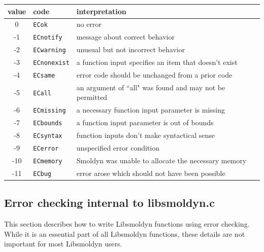 \documentclass {scrbook}
\newcommand {\ttt} {\texttt}
\begin{document}
\begin{longtable}[c]{cll}
value & code & interpretation\\
\hline
0 & \ttt{ECok} & no error\\
-1 & \ttt{ECnotify} & message about correct behavior\\
-2 & \ttt{ECwarning} & unusual but not incorrect behavior\\
-3 & \ttt{ECnonexist} & a function input specifies an item that doesn't exist\\
-4 & \ttt{ECsame} & error code should be unchanged from a prior code\\
-5 & \ttt{ECall} & an argument of ``all" was found and may not be permitted\\
-6 & \ttt{ECmissing} & a necessary function input parameter is missing\\
-7 & \ttt{ECbounds} & a function input parameter is out of bounds\\
-8 & \ttt{ECsyntax} & function inputs don't make syntactical sense\\
-9 & \ttt{ECerror} & unspecified error condition\\
-10 & \ttt{ECmemory} & Smoldyn was unable to allocate the necessary memory\\
-11 & \ttt{ECbug} & error arose which should not have been possible\\

\end{longtable}

\subsection*{Error checking internal to libsmoldyn.c}

This section describes how to write Libsmoldyn functions using error checking. While it is an essential part of all Libsmoldyn functions, these details are not important for most Libsmoldyn users.
\end{document}
